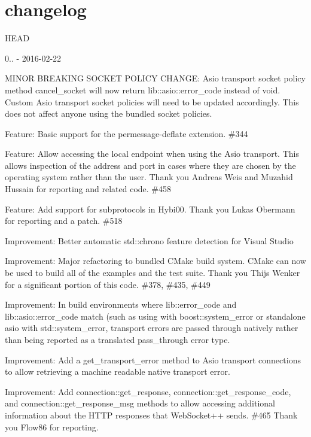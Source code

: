 \chapter{changelog}
\hypertarget{md_libraries_2fc_2vendor_2websocketpp_2changelog}{}\label{md_libraries_2fc_2vendor_2websocketpp_2changelog}
HEAD

0.. -\/ 2016-\/02-\/22
\begin{DoxyItemize}
\item MINOR BREAKING SOCKET POLICY CHANGE\+: Asio transport socket policy method {\ttfamily cancel\+\_\+socket} will now return {\ttfamily lib\+::asio\+::error\+\_\+code} instead of {\ttfamily void}. Custom Asio transport socket policies will need to be updated accordingly. This does not affect anyone using the bundled socket policies.
\item Feature\+: Basic support for the permessage-\/deflate extension. \#344
\item Feature\+: Allow accessing the local endpoint when using the Asio transport. This allows inspection of the address and port in cases where they are chosen by the operating system rather than the user. Thank you Andreas Weis and Muzahid Hussain for reporting and related code. \#458
\item Feature\+: Add support for subprotocols in Hybi00. Thank you Lukas Obermann for reporting and a patch. \#518
\item Improvement\+: Better automatic std\+::chrono feature detection for Visual Studio
\item Improvement\+: Major refactoring to bundled CMake build system. CMake can now be used to build all of the examples and the test suite. Thank you Thijs Wenker for a significant portion of this code. \#378, \#435, \#449
\item Improvement\+: In build environments where {\ttfamily lib\+::error\+\_\+code} and {\ttfamily lib\+::asio\+::error\+\_\+code} match (such as using {\ttfamily {}} with {\ttfamily boost\+::system\+\_\+error} or standalone asio with {\ttfamily std\+::system\+\_\+error}, transport errors are passed through natively rather than being reported as a translated {\ttfamily pass\+\_\+through} error type.
\item Improvement\+: Add a {\ttfamily get\+\_\+transport\+\_\+error} method to Asio transport connections to allow retrieving a machine readable native transport error.
\item Improvement\+: Add {\ttfamily connection\+::get\+\_\+response}, {\ttfamily connection\+::get\+\_\+response\+\_\+code}, and {\ttfamily connection\+::get\+\_\+response\+\_\+msg} methods to allow accessing additional information about the HTTP responses that Web\+Socket++ sends. \#465 Thank you Flow86 for reporting.

\end{DoxyItemize}
